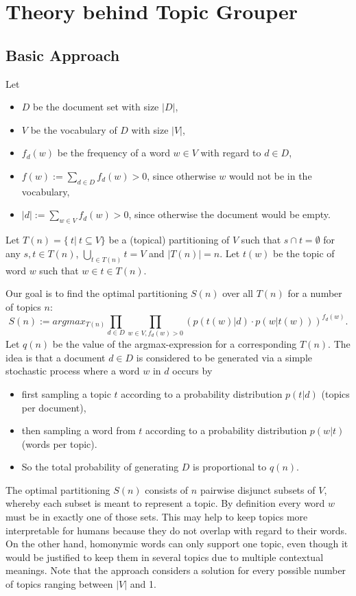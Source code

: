 \documentclass[10pt, a4paper, oneside]{article}
\begin{document}
\section{Theory behind Topic Grouper}

\subsection{Basic Approach}
\label{basics}
Let
\begin{itemize}
\item $D$ be the document set with size $|D|$,
\item $V$ be the vocabulary of $D$ with size $|V|$,
\item $f_d(w)$ be the frequency of a word $w \in V$ with regard to $d \in D$,
\item $f(w) := \sum_{d \in D} f_d(w) > 0$, since otherwise $w$ would not be in the vocabulary,
\item $|d| := \sum_{w \in V} f_d(w) > 0$, since otherwise the document would be empty.
\end{itemize}
Let $T(n) = \{\ t |\ t \subseteq V\} $ be a (topical) partitioning of $V$ such that $s \cap t = \emptyset$ for any $s, t \in T(n)$, $\bigcup_{t \in T(n)} t = V$ and $|T(n)| = n$.
Let $t(w)$ be the topic of word $w$ such that $w \in t \in T(n)$.

Our goal is to find the optimal partitioning $S(n)$ over all $T(n)$ for a number of topics $n$:
\begin{equation}
\label{sn} 
S(n) := argmax_{T(n)} \prod_{d \in D} \prod_{w \in V, f_d(w) > 0} (p(t(w) | d) \cdot p(w | t(w)))^{f_d(w)}.
\end{equation}
Let $q(n)$ be the value of the argmax-expression for a corresponding $T(n)$.
The idea is that a document $d \in D$ is considered to be generated via a simple stochastic process where a word $w$ in $d$
occurs by
\begin{itemize}
\item first sampling a topic $t$ according to a probability distribution $p(t | d)$ (topics per document),
\item then sampling a word from $t$ according to a probability distribution $p(w | t)$ (words per topic).
\item So the total probability of generating $D$ is proportional to $q(n)$.
\end{itemize}
The optimal partitioning $S(n)$ consists of $n$ pairwise disjunct subsets of $V$, whereby each subset is meant to represent a topic.
By definition every word $w$ must be in exactly one of those sets. This may help to keep topics more interpretable for humans because they do not overlap with regard to their words. On the other hand, homonymic words can only support one topic, even though it would be justified to keep them in several topics due to multiple contextual meanings. Note that the approach considers a solution for every possible number of topics ranging between $|V|$ and 1.
\end{document}
